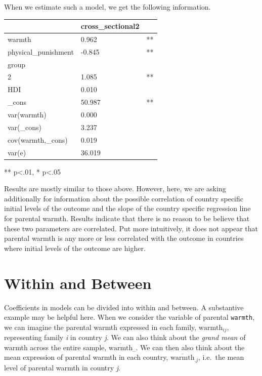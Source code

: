 \documentclass[
  letterpaper,
  DIV=11,
  numbers=noendperiod]{scrreprt}
\begin{document}
When we estimate such a model, we get the following information.

\begin{longtable}[]{@{}lll@{}}
\toprule()
& cross\_sectional2 & \\
\midrule()
\endhead
warmth & 0.962 & ** \\
physical\_punishment & -0.845 & ** \\
group & & \\
2 & 1.085 & ** \\
HDI & 0.010 & \\
\_cons & 50.987 & ** \\
var(warmth) & 0.000 & \\
var(\_cons) & 3.237 & \\
cov(warmth,\_cons) & 0.019 & \\
var(e) & 36.019 & \\
\bottomrule()
\end{longtable}

** p\textless.01, * p\textless.05

Results are mostly similar to those above. However, here, we are asking
additionally for information about the possible correlation of country
specific initial levels of the outcome and the slope of the country
specific regression line for parental warmth. Results indicate that
there is no reason to be believe that these two parameters are
correlated. Put more intuitively, it does not appear that parental
warmth is any more or less correlated with the outcome in countries
where initial levels of the outcome are higher.

\hypertarget{sec-withinbetween}{%
\section{Within and Between}\label{sec-withinbetween}}

Coefficients in models can be divided into within and between. A
substantive example may be helpful here. When we consider the variable
of parental \texttt{warmth}, we can imagine the parental warmth
expressed in each family, \(\text{warmth}_{ij}\), representing family
\emph{i} in country \emph{j}. We can also think about the \emph{grand
mean} of warmth across the entire sample,
\(\overline{\text{warmth}}_{..}\). We can then also think about the mean
expression of parental warmth in each country,
\(\overline{\text{warmth}}_{.j}\), i.e.~the mean level of parental
warmth in country \emph{j}.
\end{document}
